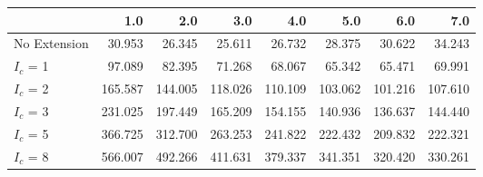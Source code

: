 \begin{tabular}{lrrrrrrr}
\toprule
{} &     1.0 &     2.0 &     3.0 &     4.0 &     5.0 &     6.0 &     7.0 \\
\midrule
No Extension &  30.953 &  26.345 &  25.611 &  26.732 &  28.375 &  30.622 &  34.243 \\
$I_c$ = 1    &  97.089 &  82.395 &  71.268 &  68.067 &  65.342 &  65.471 &  69.991 \\
$I_c$ = 2    & 165.587 & 144.005 & 118.026 & 110.109 & 103.062 & 101.216 & 107.610 \\
$I_c$ = 3    & 231.025 & 197.449 & 165.209 & 154.155 & 140.936 & 136.637 & 144.440 \\
$I_c$ = 5    & 366.725 & 312.700 & 263.253 & 241.822 & 222.432 & 209.832 & 222.321 \\
$I_c$ = 8    & 566.007 & 492.266 & 411.631 & 379.337 & 341.351 & 320.420 & 330.261 \\
\bottomrule
\end{tabular}
